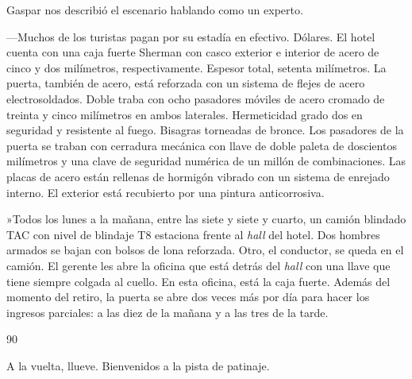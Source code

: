 \documentclass[12pt,twoside,openright,a5paper]{book}
\begin{document}
\nopagebreak

\vspace{0.5cm}

\nopagebreak

Gaspar nos describió el escenario hablando como un experto.

---Muchos de los turistas pagan por su estadía en efectivo. Dólares.
El hotel cuenta con una caja fuerte Sherman con casco exterior e interior de
acero de cinco y dos milímetros, respectivamente. Espesor total, setenta milímetros. La
puerta, también de acero, está reforzada con un sistema de flejes de
acero electrosoldados. Doble traba con ocho pasadores móviles de acero
cromado de treinta y cinco milímetros en ambos laterales. Hermeticidad grado
dos en seguridad y resistente al fuego. Bisagras torneadas de bronce. Los
pasadores de la puerta se traban con cerradura mecánica con llave de
doble paleta de doscientos milímetros y una clave de seguridad numérica de un
millón de combinaciones. Las placas de acero están rellenas de hormigón
vibrado con un sistema de enrejado interno. El exterior está recubierto por
una pintura anticorrosiva.

»Todos los lunes a la mañana, entre las siete y siete y cuarto, un camión blindado
TAC con nivel de blindaje T8 estaciona frente al \emph{hall} del hotel. Dos hombres
armados se bajan con bolsos de lona reforzada. Otro, el conductor, se queda
en el camión. El gerente les abre la oficina que está detrás del \emph{hall} con
una llave que tiene siempre colgada al cuello. En esta oficina, está la
caja fuerte. Además del momento del retiro, la puerta se abre dos veces más
por día para hacer los ingresos parciales: a las diez de la mañana
y a las tres de la tarde.


\vspace{0.5cm}

\hrulefill \hspace{0.1cm}\decofourleft\hspace{0.2cm} 90 \hspace{0.2cm}\decofourright \hspace{0.1cm}\hrulefill

\nopagebreak

\vspace{0.5cm}

\nopagebreak

A la vuelta, llueve. Bienvenidos a la pista de patinaje.

\vspace{0.5cm}
\end{document}
